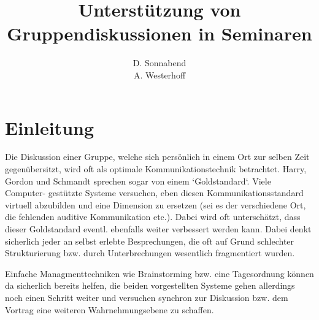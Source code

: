 \documentclass{seminarvorlage}
\begin{document}
\title{Unterstützung von Gruppendiskussionen in Seminaren}
\author{
  \alignauthor D. Sonnabend\\
  \alignauthor A. Westerhoff\\
}

\maketitle




\section{Einleitung}
Die Diskussion einer Gruppe, welche sich persönlich in einem Ort zur selben Zeit
gegenübersitzt, wird oft als optimale Kommunikationstechnik betrachtet. Harry,
Gordon und Schmandt sprechen sogar von einem `Goldstandard`. Viele Computer-
gestützte Systeme versuchen, eben diesen Kommunikationsstandard virtuell
abzubilden und eine Dimension zu ersetzen (sei es der verschiedene Ort, die
fehlenden auditive Kommunikation etc.). Dabei wird oft unterschätzt, dass dieser
Goldstandard eventl. ebenfalls weiter verbessert werden kann. Dabei denkt
sicherlich jeder an selbst erlebte Besprechungen, die oft auf Grund schlechter
Strukturierung bzw. durch Unterbrechungen wesentlich fragmentiert wurden.

Einfache Managmenttechniken wie Brainstorming bzw. eine Tagesordnung können da
sicherlich bereits helfen, die beiden vorgestellten Systeme gehen allerdings
noch einen Schritt weiter und versuchen synchron zur Diskussion bzw. dem Vortrag
eine weiteren Wahrnehmungsebene zu schaffen.
\end{document}
